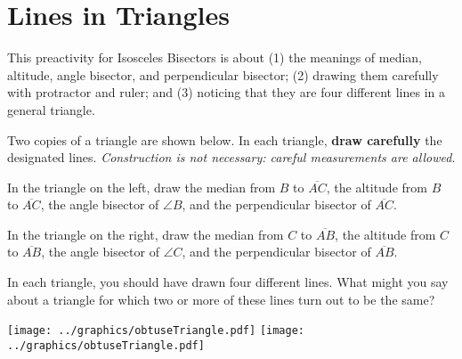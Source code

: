 \newpage

\section{Lines in Triangles}
\begin{teachingnote}
This preactivity for Isosceles Bisectors is about (1) the meanings of median, altitude, angle bisector, and perpendicular bisector; (2) drawing them carefully with protractor and ruler; and (3) noticing that they are four different lines in a general triangle. 
\end{teachingnote}

Two copies of a triangle are shown below.   In each triangle, \textbf{draw carefully} the designated lines.  \emph{Construction is not necessary:  careful measurements are allowed.}

\begin{prob}
In the triangle on the left, draw the median from $B$ to $\overline{AC}$, the altitude from $B$ to $\overline{AC}$, the angle bisector of $\angle B$, and the perpendicular bisector of $\overline{AC}$.  

\end{prob}

\begin{prob}
In the triangle on the right, draw the median from $C$ to $\overline{AB}$, the altitude from $C$ to $\overline{AB}$, the angle bisector of $\angle C$, and the perpendicular bisector of $\overline{AB}$. 

%
\end{prob}

\begin{prob}
In each triangle, you should have drawn four different lines.  What might you say about a triangle for which two or more of these lines turn out to be the same?  
\end{prob}

\vfill
\begin{fullwidth}
\texttt{[image: ../graphics/obtuseTriangle.pdf]}
\texttt{[image: ../graphics/obtuseTriangle.pdf]}
\end{fullwidth}

\vfill
